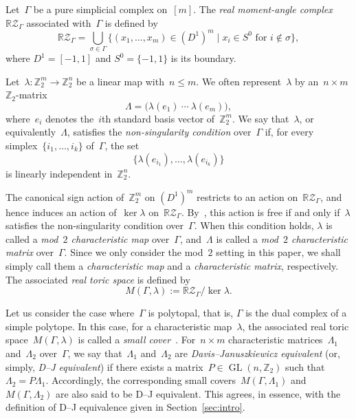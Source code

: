 \documentclass[11pt]{amsart}
\theoremstyle{plain}
\numberwithin{equation}{section}
\theoremstyle{definition}
\newcommand{\Z}{\mathbb{Z}}
\newcommand{\R}{\mathbb{R}}
\newcommand{\RZ}{\mathbb{R}\mathcal{Z}}
\newcommand{\cZ}{\mathcal{Z}}
\DeclareMathOperator{\GL}{GL}
\begin{document}
Let~$\Gamma$ be a pure simplicial complex on~$[m]$.
The \emph{real moment-angle complex}~$\R\cZ_{\Gamma}$ associated with~$\Gamma$ is defined by
$$
\R\cZ_{\Gamma} = \bigcup_{\sigma \in \Gamma}\bigl\{ (x_1,\ldots,x_m) \in (D^1)^m \mid x_i \in S^0 \text{ for } i \notin \sigma \bigr\},
$$
where $D^1 = [-1,1]$ and $S^0 = \{-1,1\}$ is its boundary.

Let~$\lambda \colon \Z_2^m \longrightarrow \Z_2^n$ be a linear map with~$n \leq m$.
We often represent~$\lambda$ by an~$n \times m$ $\Z_2$-matrix
$$
\Lambda = \big( \lambda(e_1) \ \cdots \ \lambda(e_m) \big),
$$
where~$e_i$ denotes the~$i$th standard basis vector of~$\Z_2^m$.
We say that~$\lambda$, or equivalently~$\Lambda$, satisfies the
\emph{non-singularity condition} over~$\Gamma$ if, for every simplex~$\{i_1,\ldots,i_k\}$ of~$\Gamma$, the set
$$
\{\lambda(e_{i_1}),\ldots,\lambda(e_{i_k})\}
$$
is linearly independent in~$\Z_2^n$.

The canonical sign action of~$\Z_2^m$ on $(D^1)^m$ restricts to an action on~$\RZ_\Gamma$, and hence induces an action of~$\ker\lambda$ on~$\RZ_\Gamma$.
By~\cite{Choi-Kaji-Theriault2017}, this action is free if and only if~$\lambda$ satisfies the non-singularity condition over~$\Gamma$.
When this condition holds, $\lambda$ is called a \emph{mod~$2$ characteristic map} over~$\Gamma$, and~$\Lambda$ is called a \emph{mod~$2$ characteristic matrix} over~$\Gamma$.
Since we only consider the mod~$2$ setting in this paper, we shall simply call them a \emph{characteristic map} and a \emph{characteristic matrix}, respectively.
The associated \emph{real toric space} is defined by
$$
    M(\Gamma,\lambda) := \RZ_\Gamma/\ker\lambda.
$$

Let us consider the case where~$\Gamma$ is polytopal, that is, $\Gamma$ is the dual complex of a simple polytope.
In this case, for a characteristic map~$\lambda$, the associated real toric space~$M(\Gamma,\lambda)$ is called a \emph{small cover}~\cite{Davis-Januszkiewicz1991}.
For~$n \times m$ characteristic matrices~$\Lambda_1$ and~$\Lambda_2$ over~$\Gamma$, we say that~$\Lambda_1$ and~$\Lambda_2$ are \emph{Davis--Januszkiewicz equivalent} (or, simply, \emph{D--J equivalent}) if there exists a matrix~$P \in \GL(n,\Z_2)$ such that~$\Lambda_2 = P\Lambda_1$.
Accordingly, the corresponding small covers~$M(\Gamma,\Lambda_1)$ and~$M(\Gamma,\Lambda_2)$ are also said to be D--J equivalent.
This agrees, in essence, with the definition of D--J equivalence given in Section~\ref{sec:intro}.
\end{document}
